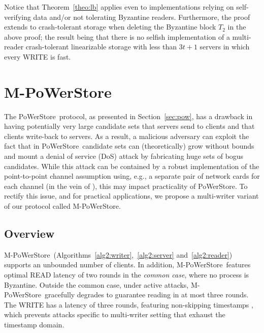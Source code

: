 \documentclass[10pt,conference,compsocconf]{IEEEtran}
\newcommand{\protocol}{PoWerStore}
\newcommand{\mprotocol}{M-PoWerStore}
\begin{document}
Notice that Theorem~\ref{theo:lb} applies even to implementations relying on self-verifying data and/or not tolerating Byzantine readers. Furthermore, the proof extends to crash-tolerant storage when deleting the Byzantine block $T_2$ in the above proof; the result being that there is no selfish implementation of a multi-reader crash-tolerant linearizable storage with less than $3t+1$ servers in which every \textsc{WRITE} is fast.


\section{\mprotocol}\label{sec:mpow}

The \protocol\ protocol, as presented in Section~\ref{sec:pow}, has a drawback in having potentially very large candidate sets that servers send to clients and that clients write-back to servers. As a result, a malicious adversary can exploit the fact that in \protocol\ candidate sets can (theoretically) grow without bounds and mount
a denial of service (DoS) attack by fabricating huge sets of bogus candidates. While this attack can be contained by a robust implementation of the point-to-point channel assumption using, e.g., a separate pair of network cards for each channel (in the vein of \cite{CWADM09}), this may impact practicality of \protocol. To rectify this issue, and for practical applications, we propose a multi-writer variant of our protocol called \mprotocol.

\subsection{Overview}

\mprotocol\ (Algorithms~\ref{alg2:writer},~\ref{alg2:server} and~\ref{alg2:reader}) supports an unbounded number of clients. In addition, \mprotocol\ features optimal \textsc{READ} latency of two rounds in the \emph{common case}, where no process is Byzantine. Outside the common case, under active attacks, \mprotocol\ gracefully degrades to guarantee reading in at most three rounds. The \textsc{WRITE} has a latency of three rounds, featuring non-skipping timestamps \cite{BD04}, which prevents attacks specific to multi-writer setting that exhaust the timestamp domain.
\end{document}
